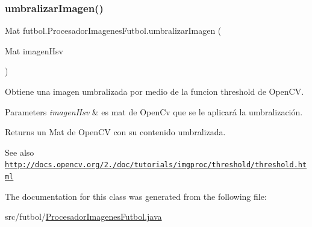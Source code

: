 \subsubsection{\texorpdfstring{umbralizar\+Imagen()}{umbralizarImagen()}}
{\footnotesize\ttfamily Mat futbol.\+Procesador\+Imagenes\+Futbol.\+umbralizar\+Imagen (\begin{DoxyParamCaption}\item[{Mat}]{imagen\+Hsv }\end{DoxyParamCaption})\hspace{0.3cm}{\ttfamily [private]}}

Obtiene una imagen umbralizada por medio de la funcion threshold de Open\+CV. 
\begin{DoxyParams}{Parameters}
{\em imagen\+Hsv} & es mat de Open\+Cv que se le aplicará la umbralización. \\
\hline
\end{DoxyParams}
\begin{DoxyReturn}{Returns}
un Mat de Open\+CV con su contenido umbralizada. 
\end{DoxyReturn}
\begin{DoxySeeAlso}{See also}
\href{http://docs.opencv.org/2.4/doc/tutorials/imgproc/threshold/threshold.html}{\tt http\+://docs.\+opencv.\+org/2./doc/tutorials/imgproc/threshold/threshold.\+html} 
\end{DoxySeeAlso}


The documentation for this class was generated from the following file\+:\begin{DoxyCompactItemize}
\item 
src/futbol/\hyperlink{_procesador_imagenes_futbol_8java}{Procesador\+Imagenes\+Futbol.\+java}\end{DoxyCompactItemize}
